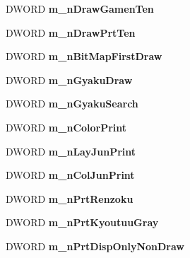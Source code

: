 \begin{DoxyCompactItemize}
\item 
\hypertarget{classJWWHead_af2d2c2dc16bd438bc96ed3c0390636f4}{D\-W\-O\-R\-D {\bfseries m\-\_\-n\-Draw\-Gamen\-Ten}}\label{classJWWHead_af2d2c2dc16bd438bc96ed3c0390636f4}

\item 
\hypertarget{classJWWHead_af83bf48a4661beb689595b11d828fa58}{D\-W\-O\-R\-D {\bfseries m\-\_\-n\-Draw\-Prt\-Ten}}\label{classJWWHead_af83bf48a4661beb689595b11d828fa58}

\item 
\hypertarget{classJWWHead_af71a6f2f733e930017b3afcedf639676}{D\-W\-O\-R\-D {\bfseries m\-\_\-n\-Bit\-Map\-First\-Draw}}\label{classJWWHead_af71a6f2f733e930017b3afcedf639676}

\item 
\hypertarget{classJWWHead_ab0431e9c67f3deb098bd2aca55a0da95}{D\-W\-O\-R\-D {\bfseries m\-\_\-n\-Gyaku\-Draw}}\label{classJWWHead_ab0431e9c67f3deb098bd2aca55a0da95}

\item 
\hypertarget{classJWWHead_af00ccab12a115e92bf519be57b886aa8}{D\-W\-O\-R\-D {\bfseries m\-\_\-n\-Gyaku\-Search}}\label{classJWWHead_af00ccab12a115e92bf519be57b886aa8}

\item 
\hypertarget{classJWWHead_a918b4e9e6d23f89de97a6777f3be31aa}{D\-W\-O\-R\-D {\bfseries m\-\_\-n\-Color\-Print}}\label{classJWWHead_a918b4e9e6d23f89de97a6777f3be31aa}

\item 
\hypertarget{classJWWHead_a0379d4f57ddd2fc501679003538809bf}{D\-W\-O\-R\-D {\bfseries m\-\_\-n\-Lay\-Jun\-Print}}\label{classJWWHead_a0379d4f57ddd2fc501679003538809bf}

\item 
\hypertarget{classJWWHead_a3bb076a4a11e0a3754675211600499f0}{D\-W\-O\-R\-D {\bfseries m\-\_\-n\-Col\-Jun\-Print}}\label{classJWWHead_a3bb076a4a11e0a3754675211600499f0}

\item 
\hypertarget{classJWWHead_a5895f1def1c59da867d180df34066a43}{D\-W\-O\-R\-D {\bfseries m\-\_\-n\-Prt\-Renzoku}}\label{classJWWHead_a5895f1def1c59da867d180df34066a43}

\item 
\hypertarget{classJWWHead_ad00252fabf426f27e6f3c1d43694b2c8}{D\-W\-O\-R\-D {\bfseries m\-\_\-n\-Prt\-Kyoutuu\-Gray}}\label{classJWWHead_ad00252fabf426f27e6f3c1d43694b2c8}

\item 
\hypertarget{classJWWHead_a21ccf1fc127b3d3d39ea54a07d6d2359}{D\-W\-O\-R\-D {\bfseries m\-\_\-n\-Prt\-Disp\-Only\-Non\-Draw}}\label{classJWWHead_a21ccf1fc127b3d3d39ea54a07d6d2359}


\end{DoxyCompactItemize}
